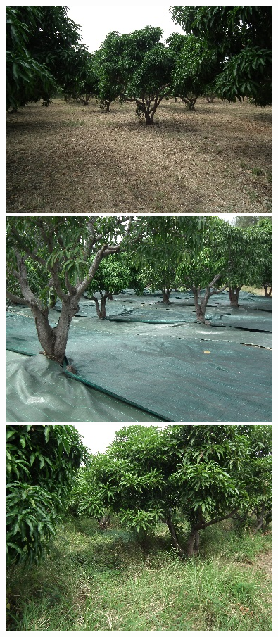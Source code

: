 \begin{figure}[ht]
 \centering
 \includegraphics{photos/er.jpg}
 \includegraphics{photos/ps.jpg}
 \includegraphics{photos/eh.jpg}
 
  \vspace{0.3cm}
 

\end{figure}
